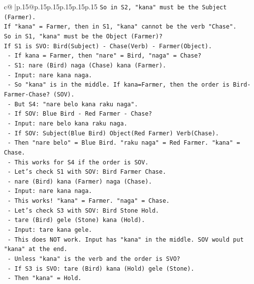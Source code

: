 \documentclass{article}
\begin{document}
{\begin{supertabular}{c@{$\;$}|p{.15\linewidth}@{}p{.15\linewidth}p{.15\linewidth}p{.15\linewidth}p{.15\linewidth}p{.15\linewidth}}
{{{\texttt{So in S2, "kana" must be the Subject (Farmer).} \\
\texttt{If "kana" = Farmer, then in S1, "kana" cannot be the verb "Chase".} \\
\texttt{So in S1, "kana" must be the Object (Farmer)?} \\
\texttt{If S1 is SVO: Bird(Subject) {-} Chase(Verb) {-} Farmer(Object).} \\
\texttt{  {-} If kana = Farmer, then "nare" = Bird, "naga" = Chase?} \\
\texttt{  {-} S1: nare (Bird) naga (Chase) kana (Farmer).} \\
\texttt{  {-} Input: nare kana naga.} \\
\texttt{  {-} So "kana" is in the middle. If kana=Farmer, then the order is Bird{-}Farmer{-}Chase? (SOV).} \\
\texttt{  {-} But S4: "nare belo kana raku naga".} \\
\texttt{    {-} If SOV: Blue Bird {-} Red Farmer {-} Chase?} \\
\texttt{    {-} Input: nare belo kana raku naga.} \\
\texttt{    {-} If SOV: Subject(Blue Bird) Object(Red Farmer) Verb(Chase).} \\
\texttt{    {-} Then "nare belo" = Blue Bird. "raku naga" = Red Farmer. "kana" = Chase.} \\
\texttt{    {-} This works for S4 if the order is SOV.} \\
\texttt{    {-} Let's check S1 with SOV: Bird Farmer Chase.} \\
\texttt{      {-} nare (Bird) kana (Farmer) naga (Chase).} \\
\texttt{      {-} Input: nare kana naga.} \\
\texttt{      {-} This works! "kana" = Farmer. "naga" = Chase.} \\
\texttt{    {-} Let's check S3 with SOV: Bird Stone Hold.} \\
\texttt{      {-} tare (Bird) gele (Stone) kana (Hold).} \\
\texttt{      {-} Input: tare kana gele.} \\
\texttt{      {-} This does NOT work. Input has "kana" in the middle. SOV would put "kana" at the end.} \\
\texttt{      {-} Unless "kana" is the verb and the order is SVO?} \\
\texttt{      {-} If S3 is SVO: tare (Bird) kana (Hold) gele (Stone).} \\
\texttt{      {-} Then "kana" = Hold.} \\
}}}
\end{supertabular}}
\end{document}
